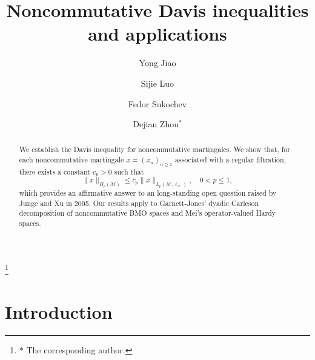 \documentclass[11]{amsart}
\numberwithin{equation}{section}
\begin{document}
\title[Davis inequality for noncommutative  martingales]{Noncommutative Davis inequalities and applications}

\authors

\author[Jiao]{Yong Jiao}
\address{School of Mathematics and Statistics,
	Central South University, Changsha 410083, China}

\author[Luo]{Sijie Luo}
\address{School of Mathematics and Statistics,
	Central South University, Changsha 410083, China}

\author[Sukochev]{Fedor Sukochev}
\address{School of Mathematics and Statistics,
	UNSW, Australia}

\author[Zhou]{Dejian Zhou$^*$}
\address{School of Mathematics and Statistics,
	Central South University, Changsha 410083, China}


\thanks{$*$ The corresponding author.}

\begin{abstract}
We establish the Davis inequality for noncommutative martingales. We show that, for each noncommutative martingale $x=(x_n)_{n\geq1}$ associated with a regular filtration, there exists a  constant $c_p>0$ such that
$$\|x\|_{H_p(\mathcal{M})}\leq c_p\|x\|_{L_p(\mathcal{M},\ell_{\infty})},\quad 0<p\leq 1,$$
which provides an affirmative answer to an long-standing open question raised by Junge and Xu  in 2005. Our results apply to Garnett-Jones' dyadic Carleson decomposition of noncommutative BMO spaces and  Mei's operator-valued Hardy spaces. 
\end{abstract}

\maketitle

\section{Introduction}
\end{document}
